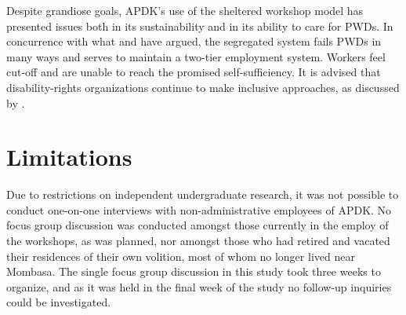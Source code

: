 \documentclass[american]{../../../coursework}
\begin{document}
Despite grandiose goals, APDK's use of the sheltered workshop model has
presented issues both in its sustainability and in its ability to care for
PWDs. In concurrence with what \textcite{Cobley2012} and \textcite{2011} have
argued, the segregated system fails PWDs in many ways and serves to maintain a
two-tier employment system. Workers feel cut-off and are unable to reach the
promised self-sufficiency. It is advised that disability-rights organizations
continue to make inclusive approaches, as discussed by \textcite{Cobley2012}.

\section{Limitations}

Due to restrictions on independent undergraduate research, it was not possible
to conduct one-on-one interviews with non-administrative employees of APDK. No
focus group discussion was conducted amongst those currently in the employ of
the workshops, as was planned, nor amongst those who had retired and vacated
their residences of their own volition, most of whom no longer lived near
Mombasa. The single focus group discussion in this study took three weeks to
organize, and as it was held in the final week of the study no follow-up
inquiries could be investigated.

\printbibliography
\end{document}

